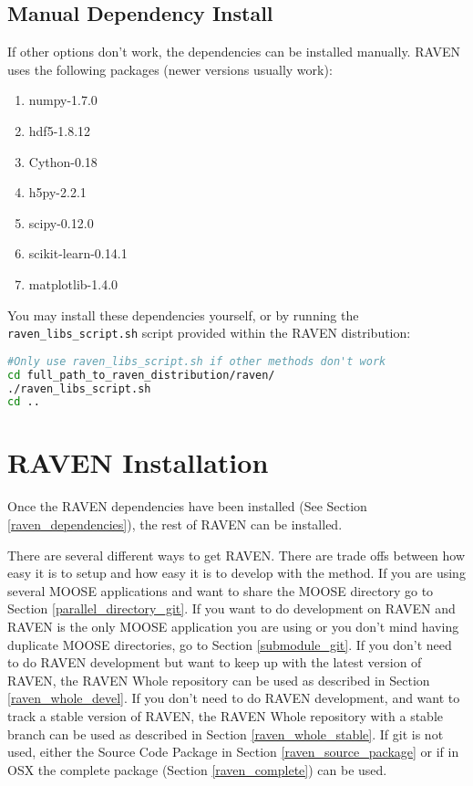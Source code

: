 \subsection{Manual Dependency Install}

If other options don't work, the dependencies can be installed
manually.  RAVEN uses the following packages (newer versions usually
work):

\begin{enumerate}
\item numpy-1.7.0
\item hdf5-1.8.12
\item Cython-0.18
\item h5py-2.2.1
\item scipy-0.12.0
\item scikit-learn-0.14.1
\item matplotlib-1.4.0
\end{enumerate}

You may install these dependencies yourself, or by running the
\texttt{raven\_libs\_script.sh} script provided within the RAVEN distribution:

\begin{lstlisting}[language=bash]
#Only use raven_libs_script.sh if other methods don't work
cd full_path_to_raven_distribution/raven/
./raven_libs_script.sh
cd ..
\end{lstlisting}

\goToRavenInstallation

\section{RAVEN Installation}
\label{raven_installation}

Once the RAVEN dependencies have been installed (See Section
\ref{raven_dependencies}), the rest of RAVEN can be installed.

There are several different ways to get RAVEN.  There are trade offs
between how easy it is to setup and how easy it is to develop with the
method.  If you are using several MOOSE applications and want to share
the MOOSE directory go to Section \ref{parallel_directory_git}.  If
you want to do development on RAVEN and RAVEN is the only MOOSE
application you are using or you don't mind having duplicate MOOSE
directories, go to Section \ref{submodule_git}.  If you don't need to
do RAVEN development but want to keep up with the latest version of
RAVEN, the RAVEN Whole repository can be used as described in Section
\ref{raven_whole_devel}.  If you don't need to do RAVEN development,
and want to track a stable version of RAVEN, the RAVEN Whole
repository with a stable branch can be used as described in Section
\ref{raven_whole_stable}.  If git is not used, either the Source Code
Package in Section \ref{raven_source_package} or if in OSX the
complete package (Section \ref{raven_complete}) can be used.

